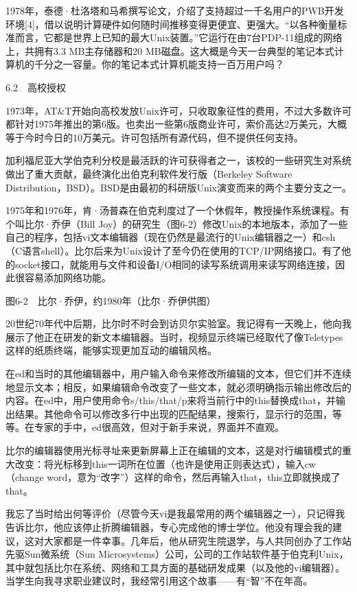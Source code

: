 \documentclass[a4paper,12pt,UTF8,twoside]{ctexbook}
\begin{document}
1978年，泰德·杜洛塔和马希撰写论文，介绍了支持超过一千名用户的PWB开发环境[4]，借以说明计算硬件如何随时间推移变得更便宜、更强大。“以各种衡量标准而言，它都是世界上已知的最大Unix装置。”它运行在由7台PDP-11组成的网络上，共拥有3.3 MB主存储器和20 MB磁盘。这大概是今天一台典型的笔记本式计算机的千分之一容量。你的笔记本式计算机能支持一百万用户吗？





6.2　高校授权


1973年，AT\&T开始向高校发放Unix许可，只收取象征性的费用，不过大多数许可都针对1975年推出的第6版。也卖出一些第6版商业许可，索价高达2万美元，大概等于今时今日的10万美元。许可包括所有源代码，但不提供任何支持。

加利福尼亚大学伯克利分校是最活跃的许可获得者之一，该校的一些研究生对系统做出了重大贡献，最终演化出伯克利软件发行版（Berkeley Software Distribution，BSD）。BSD是由最初的科研版Unix演变而来的两个主要分支之一。

1975年和1976年，肯·汤普森在伯克利度过了一个休假年，教授操作系统课程。有个叫比尔·乔伊（Bill Joy）的研究生（图6-2）修改Unix的本地版本，添加了一些自己的程序，包括vi文本编辑器（现在仍然是最流行的Unix编辑器之一）和csh（C语言shell）。比尔后来为Unix设计了至今仍在使用的TCP/IP网络接口。有了他的socket接口，就能用与文件和设备I/O相同的读写系统调用来读写网络连接，因此很容易添加网络功能。



图6-2　比尔·乔伊，约1980年（比尔·乔伊供图）

20世纪70年代中后期，比尔时不时会到访贝尔实验室。我记得有一天晚上，他向我展示了他正在研发的新文本编辑器。当时，视频显示终端已经取代了像Teletypes这样的纸质终端，能够实现更加互动的编辑风格。

在ed和当时的其他编辑器中，用户输入命令来修改所编辑的文本，但它们并不连续地显示文本；相反，如果编辑命令改变了一些文本，就必须明确指示输出修改后的内容。在ed中，用户使用命令s/this/that/p来将当前行中的this替换成that，并输出结果。其他命令可以修改多行中出现的匹配结果，搜索行，显示行的范围，等等。在专家的手中，ed很高效，但对于新手来说，界面并不直观。

比尔的编辑器使用光标寻址来更新屏幕上正在编辑的文本，这是对行编辑模式的重大改变：将光标移到this一词所在位置（也许是使用正则表达式），输入cw（change word，意为“改字”）这样的命令，然后再输入that，this立即就换成了that。

我忘了当时给出何等评价（尽管今天vi是我最常用的两个编辑器之一），只记得我告诉比尔，他应该停止折腾编辑器，专心完成他的博士学位。他没有理会我的建议，这对大家都是一件幸事。几年后，他从研究生院退学，与人共同创办了工作站先驱Sun微系统（Sun Microsystems）公司，公司的工作站软件基于伯克利Unix，其中就包括比尔在系统、网络和工具方面的基础研发成果（以及他的vi编辑器）。当学生向我寻求职业建议时，我经常引用这个故事——有“智”不在年高。
\end{document}
